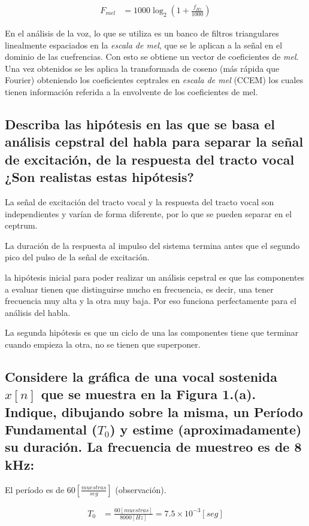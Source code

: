 \documentclass[a4paper,10pt,spanish,oneside]{article}
\begin{document}
\begin{align*}
F_{mel} &= 1000\log_{2}\left(1+\frac{f_{Hz}}{1000}\right)
\end{align*}

En el análisis de la voz, lo que se utiliza es un banco de filtros triangulares linealmente espaciados en la \textit{escala de mel}, que se le aplican a la señal en el dominio de las cuefrencias. Con esto se obtiene un vector de coeficientes de \textit{mel}. Una vez obtenidos se les aplica la transformada de coseno (más rápida que Fourier) obteniendo los coeficientes ceptrales en \textit{escala de mel} (CCEM) los cuales tienen información referida a la envolvente de los coeficientes de mel.

\subsection{Describa las hipótesis en las que se basa el análisis cepstral del habla para separar la señal de excitación, de la respuesta del tracto vocal ¿Son realistas estas hipótesis?}

La señal de excitación del tracto vocal y la respuesta del tracto vocal son independientes y varían de forma diferente, por lo que se pueden separar en el ceptrum.

La duración de la respuesta al impulso del sistema termina antes que el segundo pico del pulso de la señal de excitación.

la hipótesis inicial para poder realizar un análisis cepstral es que las componentes a evaluar tienen que distinguirse mucho en frecuencia, es decir, una tener frecuencia muy alta y la otra muy baja. Por eso funciona perfectamente para el análisis del habla.

La segunda hipótesis es que un ciclo de una las componentes tiene que terminar cuando empieza la otra, no se tienen que superponer.

\subsection{Considere la gráfica de una vocal sostenida $x[n]$ que se muestra en la Figura 1.(a). Indique, dibujando sobre la misma, un Período Fundamental ($T_{0}$) y estime (aproximadamente) su duración. La frecuencia de muestreo es de 8 kHz:}

El período es de $\displaystyle 60\left[\frac{muestras}{seg}\right]$ (observación).

\begin{align*}
T_{0} &= \frac{60[muestras]}{8000[Hz]}=7.5\times 10^{-3}[seg]
\end{align*}
\end{document}
